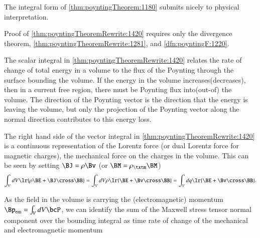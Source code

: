 The integral form of \cref{thm:poyntingTheorem:1180} submits nicely to physical interpretation.

Proof of \cref{thm:poyntingTheoremRewrite:1420} requires only the divergence theorem, \cref{thm:poyntingTheoremRewrite:1281}, and
\cref{dfn:poyntingF:1220}.

The scalar integral in \cref{thm:poyntingTheoremRewrite:1420}
relates the rate of change of total energy in a volume to the flux of the Poynting through the surface bounding the volume.
If the energy in the volume increases(decreases), then in a current free region, there must be Poynting flux into(out-of) the volume.
The direction of the Poynting vector is the direction that the energy is leaving the volume, but only the projection of the Poynting vector along the normal direction contributes to this energy loss.

The right hand side of the vector integral in \cref{thm:poyntingTheoremRewrite:1420} is a continuous representation of the Lorentz force
(or dual Lorentz force for magnetic charges),
the mechanical force on the charges in the volume.  This can be seen by setting \( \BJ = \rho \Bv \) (or \( \BM = \rho_\txtm \BM \))
\begin{dmath}\label{eqn:poyntingTheoremRewrite:1420}
\int_V dV \lr{ \rho \BE + \BJ \cross \BB }
=
\int_V dV \rho \lr{ \BE + \Bv \cross \BB }
=
\int_V dq \lr{ \BE + \Bv \cross \BB }.
\end{dmath}

As the field in the volume is carrying the (electromagnetic) momentum \( \Bp_{\textrm{em}} = \int_V dV \bcP \), we can identify the sum of the Maxwell stress tensor normal component over the bounding integral as time rate of change of the mechanical and electromagnetic momentum


